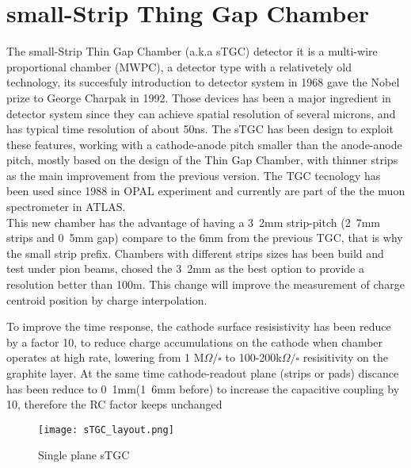 \section{small-Strip Thing Gap Chamber}

The small-Strip Thin Gap Chamber (a.k.a sTGC) detector it is a multi-wire proportional chamber (MWPC), a detector type
with a relativetely old technology, its succesfuly introduction to detector system in 1968 gave the
Nobel prize to George Charpak in 1992. 
Those devices has been a major ingredient in detector system since they can achieve spatial resolution of several
microns, and has typical time resolution of about 50ns.
The sTGC has been design to exploit these features,  working with a cathode-anode pitch smaller than the anode-anode pitch, mostly based on the design of the Thin Gap
Chamber\cite{tgc}, with thinner strips as the main improvement from the previous version. The TGC tecnology has been
used since 1988 in OPAL experiment and currently are part of the the muon spectrometer in ATLAS. \\ This new  chamber
has the advantage of having a \unit{3.2}{mm} strip-pitch (\unit{2.7}{mm} strips and \unit{0.5}{mm} gap) compare to the \unit{6}{mm} from the previous TGC, that is
why the  small strip prefix. Chambers with different strips sizes has been build and test under pion beams,
chosed the \unit{3.2}{mm} as the best option\cite{stripwidth} to provide a resolution better than \unit{100}{\micro m}.
This change will improve the measurement of charge centroid position by charge interpolation.\par
To improve the time response, the cathode surface resisistivity has been reduce by
a factor 10, to reduce charge accumulations on the cathode when chamber operates at high rate, lowering from 1
M$\Omega/\square$ to 100-200k$\Omega / \square$ resisitivity on the graphite layer. At the same time cathode-readout
plane (strips or pads) discance has been reduce to \unit{0.1}{mm}(\unit{1.6}{mm} before) to increase the capacitive coupling by 10, therefore the RC factor
keeps unchanged
 \par

\begin{figure}[ht]
		\centering
		\texttt{[image: sTGC\_layout.png]}
		\caption{Single plane sTGC}\label{fig:sTGC}
\end{figure}

